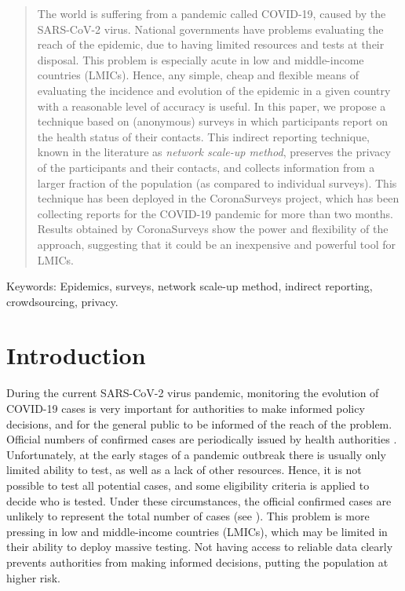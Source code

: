 \documentclass{article}
\begin{document}
\begin{abstract}
The world is suffering from a pandemic called COVID-19, caused by the SARS-CoV-2 virus. National governments have problems evaluating the reach of the epidemic, due to having limited resources and tests at their disposal. This problem is especially acute in low and middle-income countries (LMICs). Hence, any simple, cheap and flexible means of evaluating the incidence and evolution of the epidemic in a given country with a reasonable level of accuracy is useful. In this paper, we propose a technique based on (anonymous) surveys in which participants report on the health status of their contacts. This indirect reporting technique, known in the literature as \emph{network scale-up method}, preserves the privacy of the participants and their contacts, and collects information from a larger fraction of the population (as compared to individual surveys). This technique has been deployed in the CoronaSurveys project, which has been collecting reports for the COVID-19 pandemic for more than two months. Results obtained by CoronaSurveys show the power and flexibility of the approach, suggesting that it could be an inexpensive and powerful tool for LMICs.
\end{abstract}


Keywords: Epidemics, surveys, network scale-up method, indirect reporting, crowdsourcing, privacy.


\section{Introduction}

During the current SARS-CoV-2 virus pandemic, monitoring the evolution of COVID-19 cases is very important for authorities to make
informed policy decisions, and for the general public to be informed of the reach of the problem. 
Official numbers of confirmed cases are periodically issued by health authorities \cite{ECDC}. 
Unfortunately, at the early stages of a pandemic outbreak  there is usually only limited ability to test, as well as a lack of other resources. Hence, it is not possible to test all potential cases, and some eligibility criteria is applied to decide who is tested.
Under these circumstances, the official confirmed cases are unlikely to represent the total number of cases (see \cite{maxmen2020much}).
This problem is more pressing in low and middle-income countries (LMICs), which may be limited in their ability to deploy massive testing.
Not having access to reliable data clearly prevents authorities from making informed decisions, putting the population at higher risk.
\end{document}
